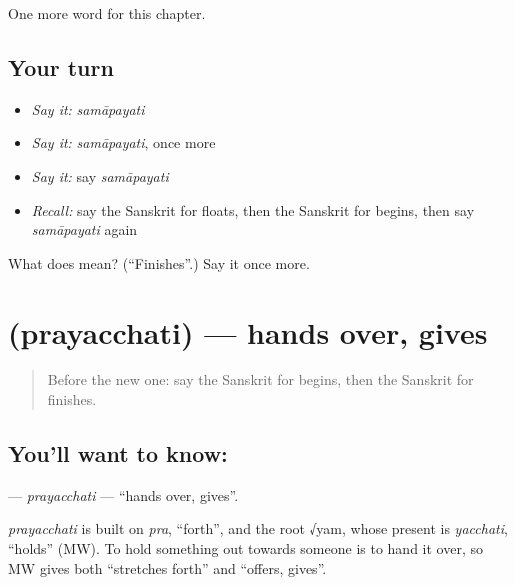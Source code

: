 \begin{grammarlens}[title={What you've built}]
One more word for this chapter.
\end{grammarlens}

\subsection*{Your turn}
\begin{itemize}
\raggedright
  \item \emph{Say it:} \emph{samāpayati}
  \item \emph{Say it:} \emph{samāpayati}, once more
  \item \emph{Say it:} say \emph{samāpayati}
  \item \emph{Recall:} say the Sanskrit for floats, then the Sanskrit for begins, then say \emph{samāpayati} again
\end{itemize}

\begin{tcolorbox}[breakable,colback=teal!4,colframe=teal!35!black,title={Before you move on}]
What does  mean? (\textquotedblleft{}Finishes\textquotedblright{}.) Say it once more.
\end{tcolorbox}
\section[\texorpdfstring{\sk{प्रयच्छति} (prayacchati)}{प्रयच्छति (prayacchati)}]{ (prayacchati) — hands over, gives}

\label{lesson:SA-C234-prayacchati}



\begin{quote}
Before the new one: say the Sanskrit for begins, then the Sanskrit for finishes.
\end{quote}

\subsection*{You'll want to know: }
\textbf{} — \emph{prayacchati} — \textquotedblleft{}hands over, gives\textquotedblright{}.

\begin{cousinweb}
\emph{prayacchati} is built on \emph{pra}, \textquotedblleft{}forth\textquotedblright{}, and the root √yam, whose present is \emph{yacchati}, \textquotedblleft{}holds\textquotedblright{} (MW). To hold something out towards someone is to hand it over, so MW gives both \textquotedblleft{}stretches forth\textquotedblright{} and \textquotedblleft{}offers, gives\textquotedblright{}.
\end{cousinweb}

